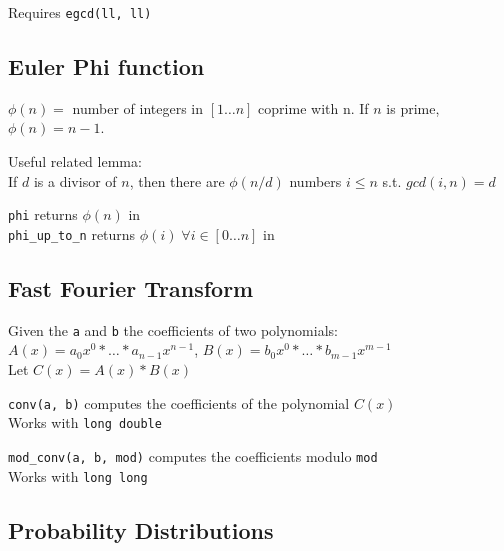 Requires \verb|egcd(ll, ll)|


\subsection{Euler Phi function}
$\phi(n) = $ number of integers in $[1\ldots n]$ coprime with n. If $n$ is prime, $\phi(n)=n-1$.

Useful related lemma: \\
If $d$ is a divisor of $n$, then there are $\phi(n / d)$ numbers $i \leq n$ s.t. $gcd(i, n) = d$

\verb|phi| returns $\phi(n)$ in  \\
\verb|phi_up_to_n| returns $\phi(i) \; \forall i \in [0 \ldots n]$ in 



\subsection{Fast Fourier Transform}

Given the \verb|a| and \verb|b| the coefficients of two polynomials: \\
$A(x) = a_0 x^0 * \ldots * a_{n-1} x^{n-1}$, $B(x) = b_0 x^0 * \ldots * b_{m-1} x^{m-1}$ \\
Let $C(x) = A(x) * B(x)$

\verb|conv(a, b)| computes the coefficients of the polynomial $C(x)$ \\
Works with \verb|long double|

\verb|mod_conv(a, b, mod)| computes the coefficients modulo \verb|mod| \\
Works with \verb|long long|



\subsection{Probability Distributions}

